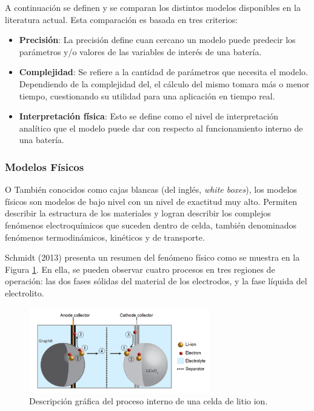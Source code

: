 \documentclass[10pt,a4paper]{article}
\begin{document}
\noindent A continuaci\'on se definen y se comparan los distintos modelos 
disponibles en la literatura actual. Esta comparaci\'on es basada en tres 
criterios:

\begin{itemize}
    \item \textbf{Precisi\'on}: La precisi\'on define cuan cercano un modelo
        puede predecir los par\'ametros y/o valores de las variables de
        inter\'es de una bater\'ia.
    \item \textbf{Complejidad}: Se refiere a la cantidad de par\'ametros que
        necesita el modelo. Dependiendo de la complejidad del, el c\'alculo 
        del mismo tomara m\'as o menor tiempo, cuestionando su utilidad para una 
        aplicaci\'on en tiempo real.
    \item \textbf{Interpretaci\'on f\'isica}: Esto se define como el nivel de
        interpretaci\'on anal\'itico que el modelo puede dar con respecto al
        funcionamiento interno de una bater\'ia.
\end{itemize}

\subsubsection{Modelos F\'isicos}\label{phyModel}

\noindent O Tambi\'en conocidos como cajas blancas (del ingl\'es, 
\emph{white boxes}), los modelos f\'isicos son modelos de bajo nivel con un 
nivel de exactitud muy alto. Permiten describir la estructura de los materiales 
y logran describir los complejos fen\'omenos electroqu\'imicos que suceden 
dentro de celda, tambi\'en denominados fen\'omenos termodin\'amicos, kin\'eticos 
y de transporte.

\noindent Schmidt (2013) presenta un resumen del fen\'omeno f\'isico como se 
muestra en la Figura \ref{schmidt_fen_fis}. En ella, se pueden observar cuatro 
procesos en tres regiones de operaci\'on: las dos fases s\'olidas del material 
de los electrodos, y la fase l\'iquida del electrolito.

\begin{figure}[h!]
    \begin{center}
        \includegraphics[width=0.7\textwidth]{schmidt_proceso_fisico.png}
        \caption{Descripci\'on gr\'afica del proceso interno de una celda de
        litio ion.}
        \label{schmidt_fen_fis}
    \end{center}
\end{figure}
\end{document}
